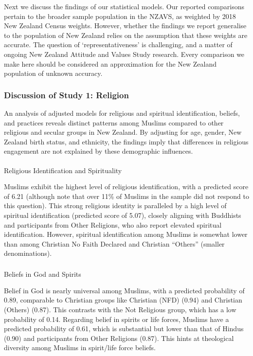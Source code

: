 \documentclass[
  single column]{article}
\makeatletter
\let\oldparagraph\paragraph
\renewcommand{\paragraph}{
    \@ifstar
      \xxxParagraphStar
      \xxxParagraphNoStar
  }
\newcommand{\xxxParagraphStar}[1]{\oldparagraph*{#1}\mbox{}}
\newcommand{\xxxParagraphNoStar}[1]{\oldparagraph{#1}\mbox{}}
\let\oldsubparagraph\subparagraph
\renewcommand{\subparagraph}{
    \@ifstar
      \xxxSubParagraphStar
      \xxxSubParagraphNoStar
  }
\newcommand{\xxxSubParagraphStar}[1]{\oldsubparagraph*{#1}\mbox{}}
\newcommand{\xxxSubParagraphNoStar}[1]{\oldsubparagraph{#1}\mbox{}}
\makeatother
\begin{document}
Next we discuss the findings of our statistical models. Our reported
comparisons pertain to the broader sample population in the NZAVS, as
weighted by 2018 New Zealand Census weights. However, whether the
findings we report generalise to the population of New Zealand relies on
the assumption that these weights are accurate. The question of
`representativeness' is challenging, and a matter of ongoing New Zealand
Attitude and Values Study research. Every comparison we make here should
be considered an approximation for the New Zealand population of unknown
accuracy.

\subsubsection{Discussion of Study 1:
Religion}\label{discussion-of-study-1-religion}

An analysis of adjusted models for religious and spiritual
identification, beliefs, and practices reveals distinct patterns among
Muslims compared to other religious and secular groups in New Zealand.
By adjusting for age, gender, New Zealand birth status, and ethnicity,
the findings imply that differences in religious engagement are not
explained by these demographic influences.

\paragraph{Religious Identification and
Spirituality}\label{religious-identification-and-spirituality}

Muslims exhibit the highest level of religious identification, with a
predicted score of 6.21 (although note that over 11\% of Muslims in the
sample did not respond to this question). This strong religious identity
is paralleled by a high level of spiritual identification (predicted
score of 5.07), closely aligning with Buddhists and participants from
Other Religions, who also report elevated spiritual identification.
However, spiritual identification among Muslims is somewhat lower than
among Christian No Faith Declared and Christian ``Others'' (smaller
denominations).

\subparagraph{Beliefs in God and
Spirits}\label{beliefs-in-god-and-spirits}

Belief in God is nearly universal among Muslims, with a predicted
probability of 0.89, comparable to Christian groups like Christian (NFD)
(0.94) and Christian (Others) (0.87). This contrasts with the Not
Religious group, which has a low probability of 0.14. Regarding belief
in spirits or life forces, Muslims have a predicted probability of 0.61,
which is substantial but lower than that of Hindus (0.90) and
participants from Other Religions (0.87). This hints at theological
diversity among Muslims in spirit/life force beliefs.
\end{document}
